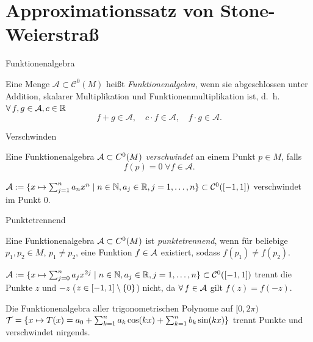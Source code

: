 \section{Approximationssatz von Stone-Weierstraß}

\begin{frame}{Funktionenalgebra}
    \begin{defi}[Funktionenalgebra]
        Eine Menge \( \mathcal{A} \subset \mathcal{C}^0(M) \) heißt 
        \textit{Funktionenalgebra}, wenn sie abgeschlossen unter Addition, 
        skalarer Multiplikation und Funktionenmultiplikation ist, 
        d.~h. \( \forall f,g \in \A, c \in \mathbb{R} \)
        \[ f + g \in \mathcal{A}, \quad c \cdot f \in \mathcal{A}, \quad f \cdot g \in \mathcal{A}. \]
    \end{defi}
\end{frame}

\begin{frame}{Verschwinden}
    \begin{defi}[Verschwinden]
        Eine Funktionenalgebra \(\mathcal{A} \subset C^0(M)\) 
        \textit{verschwindet} an einem Punkt \(p \in M\), falls 
        \[ f(p) = 0 \;\forall f \in \mathcal{A}. \]
    \end{defi}
    \pause
    \begin{bsp}
        \( \mathcal{A} := \{ x \mapsto \sum_{j=1}^n a_n x^n \;|\; n\in \mathbb{N}, a_j \in \mathbb{R}, j = 1,\ldots, n \} \subset \mathcal{C}^0([-1,1]) \) 
        verschwindet im Punkt \(0\).
    \end{bsp}
\end{frame}

\begin{frame}{Punktetrennend}
    \begin{defi}
        Eine Funktionenalgebra \(\mathcal{A} \subset C^0(M)\) ist \textit{punktetrennend}, 
        wenn für beliebige \( p_1, p_2 \in M \), \(p_1 \neq p_2\), 
        eine Funktion \(f \in \mathcal{A}\) existiert, 
        sodass \( f(p_1) \neq f(p_2) \).
    \end{defi}
    \pause
    \begin{bsp}
        \( \mathcal{A} := \{ x \mapsto \sum_{j=0}^n a_{j} x^{2j} \;|\; n\in\mathbb{N}, a_j \in \mathbb{R}, j = 1,\ldots, n \} 
        \subset \mathcal{C}^0([-1,1]) \)
        trennt die Punkte \( z \) und \(-z\) (\(z \in [-1,1] \setminus \{0\} \)) nicht, da \( \forall f \in \A \) gilt 
        \( f(z) = f(-z) \).
    \end{bsp}
    \pause
    \begin{bsp}
        Die Funktionenalgebra aller trigonometrischen Polynome auf \( [0,2\pi) \) 
        \(\mathcal{T} = \{x \mapsto T(x) = a_0 + \sum_{k=1}^n a_k \cos(kx) + \sum_{k=1}^n b_k \sin(kx)\}\) 
        trennt Punkte und verschwindet nirgends.
    \end{bsp}
\end{frame}

